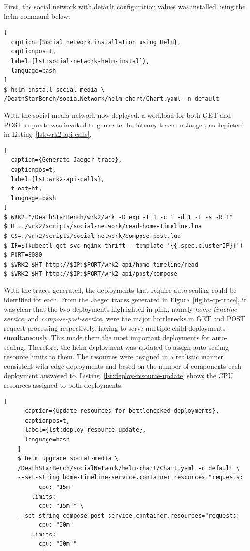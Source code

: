 First, the social network with default configuration values was installed using the helm command below:

\begin{lstlisting}[
  caption={Social network installation using Helm},
  captionpos=t,
  label={lst:social-network-helm-install},
  language=bash
]
$ helm install social-media \
/DeathStarBench/socialNetwork/helm-chart/Chart.yaml -n default
\end{lstlisting}

With the social media network now deployed, a workload for both GET and POST requests was invoked to generate the latency trace on Jaeger, as depicted in Listing~\ref{lst:wrk2-api-calls}.

\begin{lstlisting}[
  caption={Generate Jaeger trace},
  captionpos=t,
  label={lst:wrk2-api-calls},
  float=ht,
  language=bash
]
$ WRK2="/DeathStarBench/wrk2/wrk -D exp -t 1 -c 1 -d 1 -L -s -R 1"
$ HT=./wrk2/scripts/social-network/read-home-timeline.lua
$ CS=./wrk2/scripts/social-network/compose-post.lua
$ IP=$(kubectl get svc nginx-thrift --template '{{.spec.clusterIP}}')
$ PORT=8080
$ $WRK2 $HT http://$IP:$PORT/wrk2-api/home-timeline/read
$ $WRK2 $HT http://$IP:$PORT/wrk2-api/post/compose
\end{lstlisting}

With the traces generated, the deployments that require auto-scaling could be identified for each. From the Jaeger traces generated in Figure~\ref{fig:ht-cp-trace}, it was clear that the two deployments highlighted in pink, namely \textit{home-timeline-service}, and \textit{compose-post-service}, were the major bottlenecks in GET and POST request processing respectively, having to serve multiple child deployments simultaneously. This made them the most important deployments for auto-scaling. Therefore, the helm deployment was updated to assign auto-scaling resource limits to them. The resources were assigned in a realistic manner consistent with edge deployments and based on the number of components each deployment answered to. Listing~\ref{lst:deploy-resource-update} shows the CPU resources assigned to both deployments.\par

\begin{minipage}{\linewidth}
    \begin{lstlisting}[
      caption={Update resources for bottlenecked deployments},
      captionpos=t,
      label={lst:deploy-resource-update},
      language=bash
    ]
    $ helm upgrade social-media \
    /DeathStarBench/socialNetwork/helm-chart/Chart.yaml -n default \
    --set-string home-timeline-service.container.resources="requests: 
          cpu: "15m"
        limits:
          cpu: "15m"" \
    --set-string compose-post-service.container.resources="requests: 
          cpu: "30m"
        limits:
          cpu: "30m""
    \end{lstlisting}
\end{minipage}

